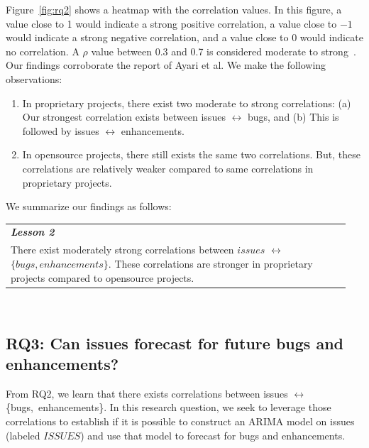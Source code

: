 \documentclass[sigconf, preprint]{acmart}
\newcommand{\be}{\begin{enumerate}}
\newcommand{\ee}{\end{enumerate}}
\newcommand{\fig}[1]{Figure~\ref{fig:#1}}
\begin{document}
\fig{rq2} shows a heatmap with the correlation values. In this figure, a value 
close to 1 would indicate a strong positive correlation, a value close to $-1$ 
would indicate a strong negative correlation, and a value close to 0 would 
indicate no correlation. A $\rho$ value between 0.3 and 0.7 is considered 
moderate to strong~\cite{seber2012linear}. Our findings corroborate the report 
of Ayari et al. We make the following observations:
\be
\item In proprietary projects, there exist two moderate to strong correlations: 
(a) Our strongest correlation exists between issues $\leftrightarrow$ bugs, and 
(b) This is followed by issues $\leftrightarrow$ enhancements.
\item In opensource projects, there still exists the same two correlations.  
But, these correlations are relatively weaker compared to same correlations in 
proprietary projects.
\ee

\noindent We summarize our findings as follows:\\[-.1cm]

\noindent\begin{minipage}{\linewidth}
	\begin{center}
		\begin{tabular}{p{0.95\linewidth}}
			\arrayrulecolor{Gray}
			\hline
			\rowcolor{Gray}
			\textbf{\textit{Lesson 2}}\bigstrut\\
			\rowcolor{Gray} There exist moderately strong correlations between 
$issues$ $\leftrightarrow$ $\{bugs , enhancements\}$. These correlations are 
stronger in proprietary projects compared to opensource 
projects.\bigstrut[b]\\\hline
\end{tabular}
\end{center}
\end{minipage}\bigstrut[t]\\[-0.2cm]

\subsection*{\normalsize{RQ3: Can issues forecast for future bugs and enhancements?}}

From RQ2, we learn that there exists correlations between \mbox{issues} 
$\leftrightarrow$ \mbox{\{bugs, enhancements\}}. In this 
research question, we seek to leverage those correlations to establish if it is 
possible to construct an ARIMA model on issues (labeled $\mathit{ISSUES}$) and 
use that model to forecast for bugs and enhancements. 
\end{document}
